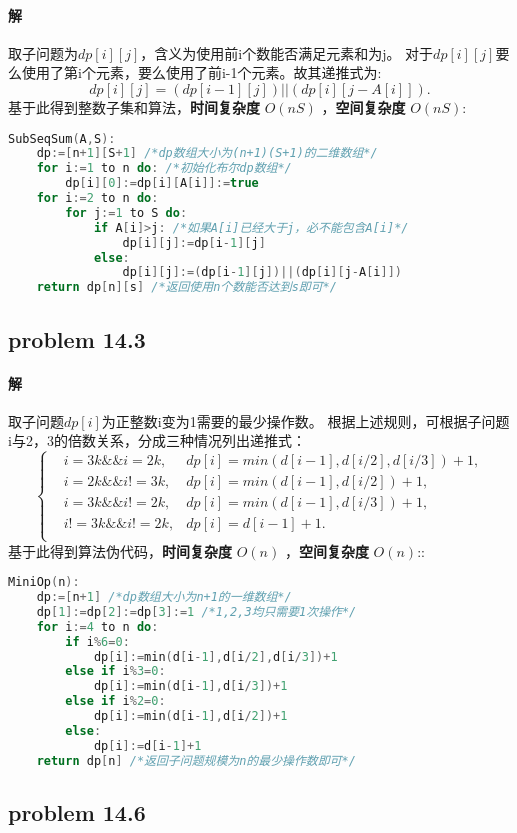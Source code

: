 \documentclass[11pt,a4paper,oneside,oldfontcommands]{ctexart}
\begin{document}
\paragraph*{解}取子问题为$dp[i][j]$，含义为使用前i个数能否满足元素和为j。
对于$dp[i][j]$要么使用了第i个元素，要么使用了前i-1个元素。故其递推式为:
$$dp[i][j]=(dp[i-1][j])||(dp[i][j-A[i]]).$$
基于此得到整数子集和算法，\textbf{时间复杂度} $O(nS)$
，\textbf{空间复杂度} $O(nS)$:
\begin{lstlisting}[language=C++,title=SubSeqSum.func]
SubSeqSum(A,S):
	dp:=[n+1][S+1] /*dp数组大小为(n+1)(S+1)的二维数组*/
	for i:=1 to n do: /*初始化布尔dp数组*/
		dp[i][0]:=dp[i][A[i]]:=true
	for i:=2 to n do:
		for j:=1 to S do:
			if A[i]>j: /*如果A[i]已经大于j，必不能包含A[i]*/
				dp[i][j]:=dp[i-1][j]
			else:
				dp[i][j]:=(dp[i-1][j])||(dp[i][j-A[i]])
	return dp[n][s] /*返回使用n个数能否达到s即可*/
\end{lstlisting}

{\subsection*{problem 14.3}}
\paragraph*{解}取子问题$dp[i]$为正整数i变为1需要的最少操作数。
根据上述规则，可根据子问题i与2，3的倍数关系，分成三种情况列出递推式：
$$\left\{
\begin{aligned}
	&i=3k\&\&i=2k,& dp[i]=min(d[i-1],d[i/2],d[i/3])+1,\\
	&i=2k\&\&i!=3k,& dp[i]=min(d[i-1],d[i/2])+1,\\
	&i=3k\&\&i!=2k,& dp[i]=min(d[i-1],d[i/3])+1,\\
	&i!=3k\&\&i!=2k,& dp[i]=d[i-1]+1.\\
\end{aligned}\right.
$$基于此得到算法伪代码，\textbf{时间复杂度} $O(n)$
，\textbf{空间复杂度} $O(n)$::
\begin{lstlisting}[language=C++,title=MiniOp.func]
MiniOp(n):
	dp:=[n+1] /*dp数组大小为n+1的一维数组*/
	dp[1]:=dp[2]:=dp[3]:=1 /*1,2,3均只需要1次操作*/
	for i:=4 to n do:
		if i%6=0:
			dp[i]:=min(d[i-1],d[i/2],d[i/3])+1
		else if i%3=0:
			dp[i]:=min(d[i-1],d[i/3])+1
		else if i%2=0:
			dp[i]:=min(d[i-1],d[i/2])+1
		else:
			dp[i]:=d[i-1]+1
	return dp[n] /*返回子问题规模为n的最少操作数即可*/
\end{lstlisting}
\newpage
{\subsection*{problem 14.6}}
\end{document}

